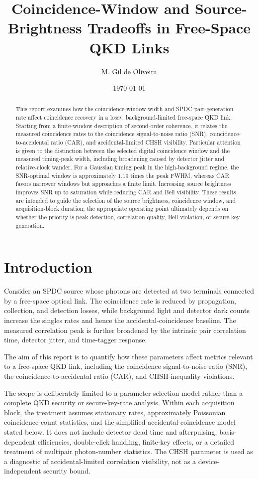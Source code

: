 \documentclass[a4paper,10pt]{article}
\title{Coincidence-Window and Source-Brightness Tradeoffs in Free-Space QKD Links}
\author{M. Gil de Oliveira}
\date{\today}
\begin{document}
\maketitle

\begin{abstract}
This report examines how the coincidence-window width and SPDC pair-generation rate affect coincidence recovery in a lossy, background-limited free-space QKD link.  Starting from a finite-window description of second-order coherence, it relates the measured coincidence rates to the coincidence signal-to-noise ratio (SNR), coincidence-to-accidental ratio (CAR), and accidental-limited CHSH visibility.  Particular attention is given to the distinction between the selected digital coincidence window and the measured timing-peak width, including broadening caused by detector jitter and relative-clock wander.  For a Gaussian timing peak in the high-background regime, the SNR-optimal window is approximately $1.19$ times the peak FWHM, whereas CAR favors narrower windows but approaches a finite limit.  Increasing source brightness improves SNR up to saturation while reducing CAR and Bell visibility.  These results are intended to guide the selection of the source brightness, coincidence window, and acquisition-block duration; the appropriate operating point ultimately depends on whether the priority is peak detection, correlation quality, Bell violation, or secure-key generation.
\end{abstract}

\section{Introduction}

Consider an SPDC source whose photons are detected at two terminals connected by a free-space optical link.  The coincidence rate is reduced by propagation, collection, and detection losses, while background light and detector dark counts increase the singles rates and hence the accidental-coincidence baseline.  The measured correlation peak is further broadened by the intrinsic pair correlation time, detector jitter, and time-tagger response.

The aim of this report is to quantify how these parameters affect metrics relevant to a free-space QKD link, including the coincidence signal-to-noise ratio (SNR), the coincidence-to-accidental ratio (CAR), and CHSH-inequality violations.

The scope is deliberately limited to a parameter-selection model rather than a complete QKD security or secure-key-rate analysis.  Within each acquisition block, the treatment assumes stationary rates, approximately Poissonian coincidence-count statistics, and the simplified accidental-coincidence model stated below.  It does not include detector dead time and afterpulsing, basis-dependent efficiencies, double-click handling, finite-key effects, or a detailed treatment of multipair photon-number statistics.  The CHSH parameter is used as a diagnostic of accidental-limited correlation visibility, not as a device-independent security bound.
\end{document}
